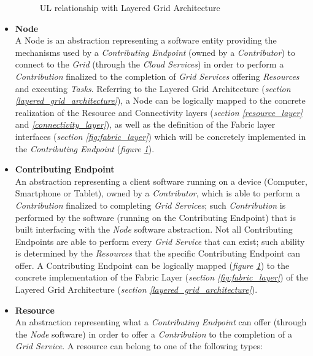 \begin{itemize}
\begin{figure}[!ht]
        \caption{UL relationship with Layered Grid Architecture}
        \label{fig:layered_grid_architecture_and_ul}
    \end{figure}
    \item \textbf{Node}\label{node}\\
    A Node is an abstraction representing a software entity providing the mechanisms used by a \textit{Contributing Endpoint} (owned by a \textit{Contributor}) to connect to the \textit{Grid} (through the \textit{Cloud Services}) in order to perform a \textit{Contribution} finalized to the completion of \textit{Grid Services} offering \textit{Resources} and executing \textit{Tasks}. Referring to the Layered Grid Architecture (\textit{section \ref{layered_grid_architecture}}), a Node can be logically mapped to the concrete realization of the Resource and Connectivity layers (\textit{section \ref{resource_layer}} and \textit{\ref{connectivity_layer}}), as well as the definition of the Fabric layer interfaces (\textit{section \ref{fig:fabric_layer}}) which will be concretely implemented in the \textit{Contributing Endpoint} (\textit{figure \ref{fig:layered_grid_architecture_and_ul}}).
    \item \textbf{Contributing Endpoint}\label{contributing_device}\\
    An abstraction representing a client software running on a device (Computer, Smartphone or Tablet), owned by a \textit{Contributor}, which is able to perform a \textit{Contribution} finalized to completing \textit{Grid Services}; such \textit{Contribution} is performed by the software (running on the Contributing Endpoint) that is built interfacing with the \textit{Node} software abstraction. Not all Contributing Endpoints are able to perform every \textit{Grid Service} that can exist; such ability is determined by the \textit{Resources} that the specific Contributing Endpoint can offer. A Contributing Endpoint can be logically mapped (\textit{figure \ref{fig:layered_grid_architecture_and_ul}}) to the concrete implementation of the Fabric Layer (\textit{section \ref{fig:fabric_layer}}) of the Layered Grid Architecture (\textit{section \ref{layered_grid_architecture}}).
    \item \textbf{Resource}\label{resource}\\
    An abstraction representing what a \textit{Contributing Endpoint} can offer (through the \textit{Node} software) in order to offer a \textit{Contribution} to the completion of a \textit{Grid Service}. A resource can belong to one of the following types:

\end{itemize}
